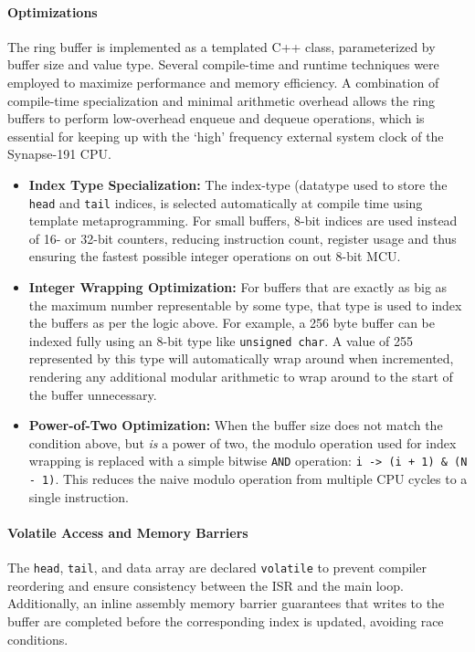 \paragraph{Optimizations} The ring buffer is implemented as a templated C++ class, parameterized by buffer size and value type. Several compile-time and runtime techniques were employed to maximize performance and memory efficiency. A combination of compile-time specialization and minimal arithmetic overhead allows the ring buffers to perform low-overhead enqueue and dequeue operations, which is essential for keeping up with the `high' frequency external system clock of the Synapse-191 CPU.

\begin{itemize}
\item \textbf{Index Type Specialization:} The index-type (datatype used to store the \texttt{head} and \texttt{tail} indices, is selected automatically at compile time using template metaprogramming. For small buffers, 8-bit indices are used instead of 16- or 32-bit counters, reducing instruction count, register usage and thus ensuring the fastest possible integer operations on out 8-bit MCU.
\item \textbf{Integer Wrapping Optimization:} For buffers that are exactly as big as the maximum number representable by some type, that type is used to index the buffers as per the logic above. For example, a 256 byte buffer can be indexed fully using an 8-bit type like \texttt{unsigned char}. A value of 255 represented by this type will automatically wrap around when incremented, rendering any additional modular arithmetic to wrap around to the start of the buffer unnecessary.
\item \textbf{Power-of-Two Optimization:} When the buffer size does not match the condition above, but \emph{is} a power of two, the modulo operation used for index wrapping is replaced with a simple bitwise \texttt{AND} operation: \texttt{i -> (i + 1) \& (N - 1)}. This reduces the naive modulo operation from multiple CPU cycles to a single instruction.
\end{itemize}

\paragraph{Volatile Access and Memory Barriers} The \texttt{head}, \texttt{tail}, and data array are declared \texttt{volatile} to prevent compiler reordering and ensure consistency between the ISR and the main loop. Additionally, an inline assembly memory barrier guarantees that writes to the buffer are completed before the corresponding index is updated, avoiding race conditions.


